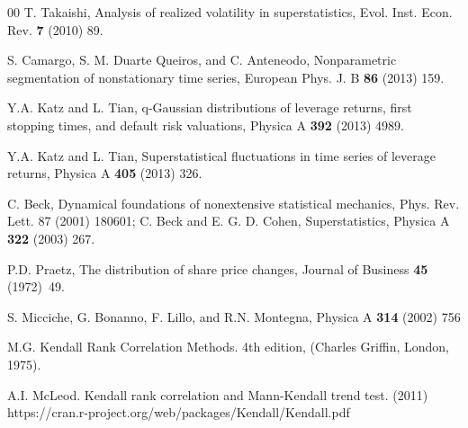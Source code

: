 \documentclass[preprint,12pt]{elsarticle}
\theoremstyle{definition}
\theoremstyle{remark}
\numberwithin{equation}{section}
\theoremstyle{definition}
\begin{document}
\begin{thebibliography}{00}
  T. Takaishi, Analysis of realized volatility in superstatistics, Evol. Inst. Econ. Rev.  \textbf{7} (2010) 89.

 S. Camargo, S. M. Duarte Queiros, and C. Anteneodo, Nonparametric segmentation of nonstationary time series, European Phys. J. B  \textbf{86} (2013) 159.

  Y.A. Katz and L. Tian, q-Gaussian distributions of leverage returns, first stopping times, and default risk valuations, Physica A  \textbf{392} (2013) 4989.

  Y.A. Katz and L. Tian, Superstatistical fluctuations in time series of leverage returns, Physica A  \textbf{405} (2013) 326.

  C. Beck, Dynamical foundations of nonextensive statistical mechanics, Phys. Rev. Lett. 87 (2001) 180601; C. Beck and E. G. D. Cohen, Superstatistics, Physica A  \textbf{322} (2003) 267.

   P.D. Praetz, The distribution of share price changes, Journal of Business  \textbf{45} (1972)~49.

   S. Micciche, G. Bonanno, F. Lillo, and R.N. Montegna, Physica A \textbf{314} (2002) 756


  M.G. Kendall  Rank Correlation Methods.  4th edition, (Charles Griffin, London, 1975).

  A.I. McLeod. Kendall rank correlation and Mann-Kendall trend test. (2011) https://cran.r-project.org/web/packages/Kendall/Kendall.pdf






\end{thebibliography}
\end{document}
